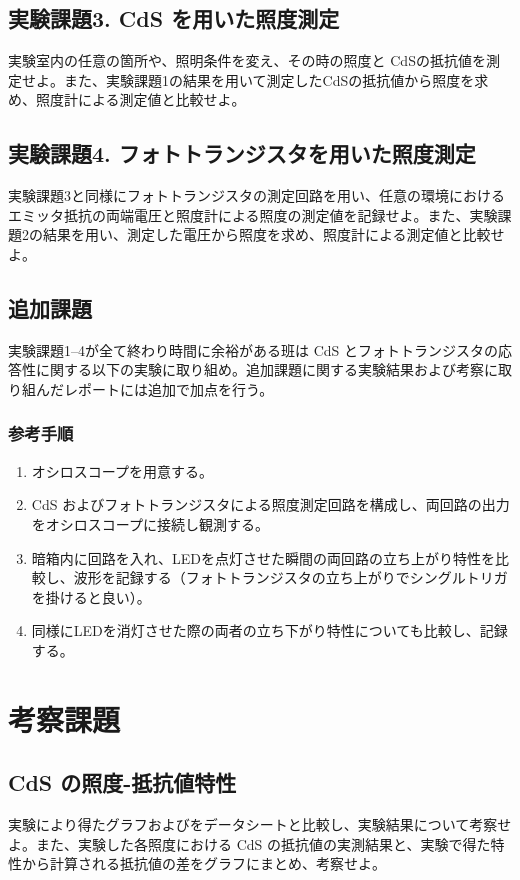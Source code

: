 \documentclass[11pt,a4paper]{jsarticle}
\begin{document}
\subsection*{実験課題3. CdS を用いた照度測定}
実験室内の任意の箇所や、照明条件を変え、その時の照度と CdSの抵抗値を測定せよ。また、実験課題1の結果を用いて測定したCdSの抵抗値から照度を求め、照度計による測定値と比較せよ。
\subsection*{実験課題4. フォトトランジスタを用いた照度測定}
実験課題3と同様にフォトトランジスタの測定回路を用い、任意の環境におけるエミッタ抵抗の両端電圧と照度計による照度の測定値を記録せよ。また、実験課題2の結果を用い、測定した電圧から照度を求め、照度計による測定値と比較せよ。

\subsection*{追加課題}
実験課題1--4が全て終わり時間に余裕がある班は CdS とフォトトランジスタの応答性に関する以下の実験に取り組め。追加課題に関する実験結果および考察に取り組んだレポートには追加で加点を行う。

\subsubsection*{参考手順}
\begin{enumerate}
    \item オシロスコープを用意する。
    \item CdS およびフォトトランジスタによる照度測定回路を構成し、両回路の出力をオシロスコープに接続し観測する。
    \item 暗箱内に回路を入れ、LEDを点灯させた瞬間の両回路の立ち上がり特性を比較し、波形を記録する（フォトトランジスタの立ち上がりでシングルトリガを掛けると良い）。
    \item 同様にLEDを消灯させた際の両者の立ち下がり特性についても比較し、記録する。
\end{enumerate}

\vspace{3mm}

\section{考察課題}

\subsection{CdS の照度-抵抗値特性}
実験により得たグラフおよびをデータシートと比較し、実験結果について考察せよ。また、実験した各照度における CdS の抵抗値の実測結果と、実験で得た特性から計算される抵抗値の差をグラフにまとめ、考察せよ。
\end{document}
